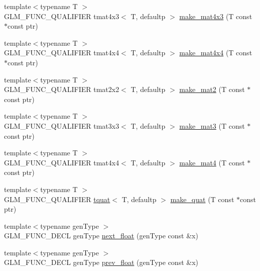 \begin{DoxyCompactItemize}
\item 
{\footnotesize template$<$typename T $>$ }\\G\+L\+M\+\_\+\+F\+U\+N\+C\+\_\+\+Q\+U\+A\+L\+I\+F\+I\+E\+R tmat4x3$<$ T, defaultp $>$ \hyperlink{group__gtc__type__ptr_ga4d42daced532b33cc672280e48670a51}{make\+\_\+mat4x3} (T const $\ast$const ptr)
\item 
{\footnotesize template$<$typename T $>$ }\\G\+L\+M\+\_\+\+F\+U\+N\+C\+\_\+\+Q\+U\+A\+L\+I\+F\+I\+E\+R tmat4x4$<$ T, defaultp $>$ \hyperlink{group__gtc__type__ptr_gaf605a5f5e2ff594e8d404b2855b09541}{make\+\_\+mat4x4} (T const $\ast$const ptr)
\item 
{\footnotesize template$<$typename T $>$ }\\G\+L\+M\+\_\+\+F\+U\+N\+C\+\_\+\+Q\+U\+A\+L\+I\+F\+I\+E\+R tmat2x2$<$ T, defaultp $>$ \hyperlink{group__gtc__type__ptr_ga52a16e333fef7e33ca740779482a8693}{make\+\_\+mat2} (T const $\ast$const ptr)
\item 
{\footnotesize template$<$typename T $>$ }\\G\+L\+M\+\_\+\+F\+U\+N\+C\+\_\+\+Q\+U\+A\+L\+I\+F\+I\+E\+R tmat3x3$<$ T, defaultp $>$ \hyperlink{group__gtc__type__ptr_gac2bc10c519ffc8db9e24f325f23787ea}{make\+\_\+mat3} (T const $\ast$const ptr)
\item 
{\footnotesize template$<$typename T $>$ }\\G\+L\+M\+\_\+\+F\+U\+N\+C\+\_\+\+Q\+U\+A\+L\+I\+F\+I\+E\+R tmat4x4$<$ T, defaultp $>$ \hyperlink{group__gtc__type__ptr_ga2c6e6d457cb932e1ce683e4f690a6f60}{make\+\_\+mat4} (T const $\ast$const ptr)
\item 
{\footnotesize template$<$typename T $>$ }\\G\+L\+M\+\_\+\+F\+U\+N\+C\+\_\+\+Q\+U\+A\+L\+I\+F\+I\+E\+R \hyperlink{structglm_1_1tquat}{tquat}$<$ T, defaultp $>$ \hyperlink{group__gtc__type__ptr_gaadafb6600af2633e4c98cc64c72f5269}{make\+\_\+quat} (T const $\ast$const ptr)
\item 
{\footnotesize template$<$typename gen\+Type $>$ }\\G\+L\+M\+\_\+\+F\+U\+N\+C\+\_\+\+D\+E\+C\+L gen\+Type \hyperlink{group__gtc__ulp_gae516ae554faa6117660828240e8bdaf0}{next\+\_\+float} (gen\+Type const \&x)
\item 
{\footnotesize template$<$typename gen\+Type $>$ }\\G\+L\+M\+\_\+\+F\+U\+N\+C\+\_\+\+D\+E\+C\+L gen\+Type \hyperlink{group__gtc__ulp_ga2fcbb7bfbfc595712bfddc51b0715b07}{prev\+\_\+float} (gen\+Type const \&x)
\item 

\end{DoxyCompactItemize}

